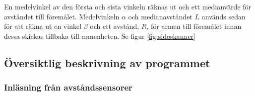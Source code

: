 En medelvinkel av den första och sista vinkeln räknas ut och ett medianvärde för avståndet till föremålet. Medelvinkeln $\alpha$ och medianavståndet $L$ används sedan för att räkna ut en vinkel $\beta$ och ett avstånd, $R$, för armen till föremålet innan dessa skickas tillbaka till armenheten. Se figur \ref{fig:sidoskanner}

\subsection{Översiktlig beskrivning av programmet}

\subsubsection{Inläsning från avståndssensorer}








